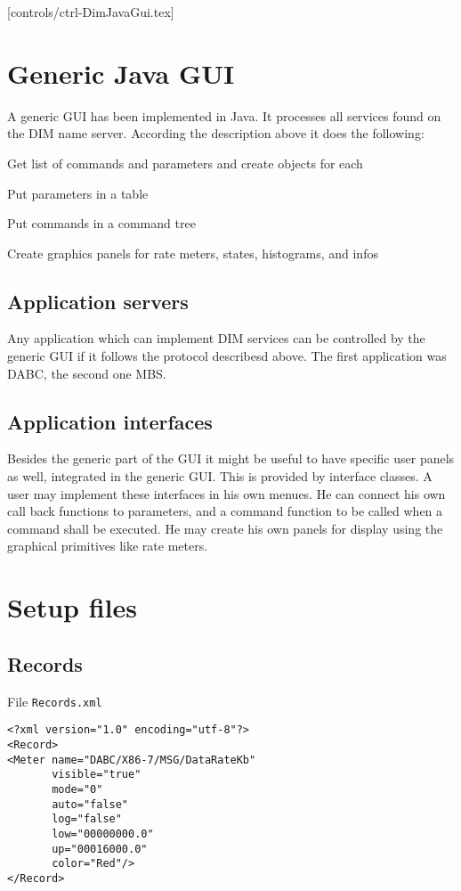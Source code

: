 [controls/ctrl-DimJavaGui.tex]
\section{Generic Java GUI}
A generic GUI has been implemented in Java. It processes all services found on the DIM name server. According the description above it does the following:
\begin{compactitem}[$\bullet$]
\item Get list of commands and parameters and create objects for each
\item Put parameters in a table
\item Put commands in a command tree
\item Create graphics panels for rate meters, states, histograms, and infos
\end{compactitem}
\subsection{Application servers}
Any application which can implement DIM services can be controlled by the generic GUI if it follows the protocol describesd above. The first application was DABC, the second one MBS.

\subsection{Application interfaces}
Besides the generic part of the GUI it might be useful to have specific user panels as well, integrated in the generic GUI. This is provided by interface classes. A user may implement these interfaces in his own menues. He can connect his own call back functions to parameters, and a command function to be called when a command shall be executed. He may create his own panels for display using the graphical primitives like rate meters.

\section{Setup files}
\subsection{Records}
File {\tt Records.xml}
\begin{verbatim}
<?xml version="1.0" encoding="utf-8"?>
<Record>
<Meter name="DABC/X86-7/MSG/DataRateKb" 
       visible="true" 
       mode="0" 
       auto="false" 
       log="false" 
       low="00000000.0" 
       up="00016000.0" 
       color="Red"/>
</Record>
\end{verbatim}

